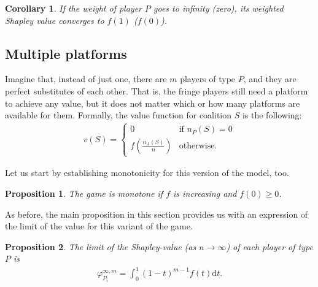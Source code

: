 \documentclass[a4paper]{article}
\newtheorem{proposition}{Proposition}
\newtheorem{corollary}{Corollary}
\newcommand{\dt}{\mathrm{d}t}
\begin{document}
\begin{corollary}
    \label{cor:paltform_value_weighted_2}
    If the weight of player $P$ goes to infinity (zero), its weighted Shapley value converges to $f(1)$ ($f(0)$).
\end{corollary}

\subsection{Multiple platforms}

Imagine that, instead of just one, there are $m$ players of type $P$, and they are perfect substitutes of each other.
That is, the fringe players still need a platform to achieve any value, but it does not matter which or how many platforms are available for them.
Formally, the value function for coalition $S$ is the following:
\begin{align*}
    v(S) = \begin{cases}
        0                              & \text{if } n_P(S) = 0 \\
        f\left(\frac{n_A(S)}{n}\right) & \text{otherwise}.
    \end{cases}
\end{align*}

Let us start by establishing monotonicity for this version of the model, too.
\begin{proposition}
    The game is monotone if $f$ is increasing and $f(0) \geq 0$.
\end{proposition}

As before, the main proposition in this section provides us with an expression of the limit of the value for this variant of the game.
\begin{proposition}
    \label{prop:multiple_platforms}
    The limit of the Shapley-value (as $n \to \infty$) of each player of type $P$ is
    \begin{align*}
        \varphi_{P_i}^{\infty, m} = \int_0^1 (1-t) ^ {m-1} f(t) \dt .
    \end{align*}
\end{proposition}
\end{document}

